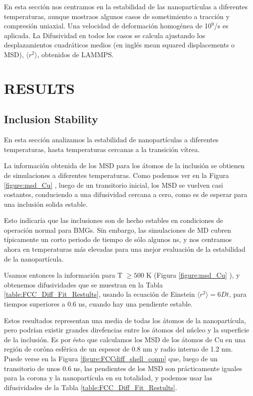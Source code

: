 En esta sección nos centramos en la estabilidad de las nanopartículas a diferentes temperaturas, aunque mostraos algunos casos de sometimiento a tracción y compresión uniaxial. Una velocidad de deformación homogénea de 10$^{9}$/s es aplicada. La Difusividad en todos los casos se calcula ajustando los desplazamientos cuadráticos medios (en inglés mean squared displacements o MSD), $\langle r^{2}\rangle$, obtenidos de LAMMPS.

\section{RESULTS}

\subsection{Inclusion Stability}

En esta sección analizamos la estabilidad de nanopartículas a diferentes temperaturas, hasta temperaturas cercanas a la transición vítrea.

La información obtenida de los MSD para los átomos de la inclusión se obtienen de simulaciones a diferentes temperaturas. Como podemos ver en la Figura \ref{figure:msd_Cu} , luego de un transitorio inicial, los MSD se vuelven casi costantes, conduciendo a una difusividad cercana a cero, como es de esperar para una inclusión solida estable.

Esto indicaría que las inclusiones son de hecho estables en condiciones de operación normal para BMGs. Sin embargo, las simulaciones de MD cubren típicamente un corto periodo de tiempo de sólo algunos ns, y nos centramos ahora en temperaturas más elevadas para una mejor evaluación de la estabilidad de la nanopartícula.

Usamos entonces la información para T $ \geq 500$ K (Figura \ref{figure:msd_Cu} ), y obtenemos difusividades que se muestran en la Tabla \ref{table:FCC_Diff_Fit_Restults}, usando la ecuación de Einstein $\langle r^{2}\rangle = 6Dt$, para tiempos superiores a 0.6 ns, cuando hay una pendiente estable.

Estos resultados representan una media de todas los átomos de la nanopartícula, pero podrían existir grandes direfencias entre los átomos del núcleo y la superficie de la inclusión. Es por ésto que calculamos los MSD de los átomos de Cu en una región de coróna esférica de un espesor de 0.8 nm y radio interno de 1.2 nm. Puede verse en la Figura \ref{figure:FCCdiff_shell_comp} que, luego de un transitorio de unos 0.6 ns, las pendientes de los MSD son prácticamente iguales para la corona y la nanopartícula en su totalidad, y podemos usar las difusividades de la Tabla \ref{table:FCC_Diff_Fit_Restults}.

